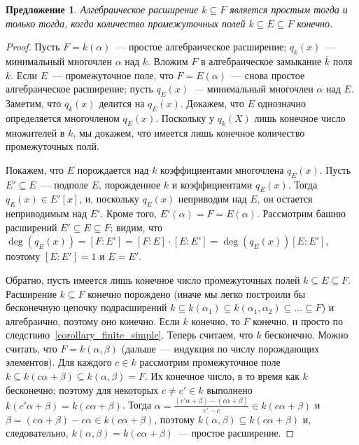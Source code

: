 \documentclass[a4paper,11pt]{scrartcl}
\theoremstyle{plain}
\newtheorem{proposition}[theorem]{Предложение}
\theoremstyle{definition}
\newcommand\sseq{\subseteq}
\begin{document}
\begin{proposition}
Алгебраическое расширение $k\sseq F$ является простым тогда и только
тогда, когда количество промежуточных полей $k\sseq E\sseq F$ конечно.
\end{proposition}
\begin{proof}
Пусть $F=k(\alpha)$~--- простое алгебраическое расширение;
$q_k(x)$~---
минимальный многочлен $\alpha$ над $k$. Вложим $F$ в алгебраическое
замыкание $\overline{k}$ поля $k$. Если $E$~--- промежуточное поле,
что $F=E(\alpha)$~--- снова простое алгебраическое расширение; пусть
$q_E(x)$~--- минимальный многочлен $\alpha$ над $E$.
Заметим, что $q_k(x)$
делится на $q_E(x)$. Докажем, что $E$ однозначно определяется
многочленом $q_E(x)$. Поскольку у $q_k(X)$ лишь конечное число
множителей в $\overline{k}$, мы докажем, что имеется лишь конечное
количество промежуточных полй.

Покажем, что $E$ порождается над $k$ коэффициентами многочлена
$q_E(x)$. Пусть $E'\sseq E$~--- подполе $E$, порожденное $k$ и
коэффициентами $q_E(x)$. Тогда $q_E(x)\in E'[x]$, и, поскольку
$q_E(x)$ неприводим над $E$, он остается неприводимым над $E'$. Кроме
того, $E'(\alpha)=F=E(\alpha)$.
Рассмотрим башню расширений $E'\sseq E\sseq F$;
видим, что $\deg(q_E(x))=[F:E']=[F:E]\cdot
[E:E']=\deg(q_E(x))[E:E']$, поэтому $[E:E']=1$ и $E=E'$.

Обратно, пусть имеется лишь конечное число промежуточных полей
$k\sseq E\sseq F$. Расширение $k\sseq F$ конечно порождено (иначе мы
легко
построили бы бесконечную цепочку подрасширений
$k\sseq k(\alpha_1)\sseq
k(\alpha_1,\alpha_2)\sseq\dots\sseq F$) и алгебраично, поэтому оно
конечно. Если $k$ конечно, то $F$ конечно, и просто по
следствию~\ref{corollary_finite_simple}.
Теперь считаем, что $k$ бесконечно. Можно считать, что
$F=k(\alpha,\beta)$
(дальше~--- индукция по числу порождающих элементов).
Для каждого $c\in k$ рассмотрим промежуточное поле $k\sseq
k(c\alpha+\beta)\sseq k(\alpha,\beta)=F$. Их конечное число, в то
время как $k$
бесконечно; поэтому для некоторых $c\neq c'\in k$ выполнено
$k(c'\alpha+\beta)=k(c\alpha+\beta)$. Тогда
$\alpha=\frac{(c'\alpha+\beta)-(c\alpha+\beta)}{c'-c}\in
k(c\alpha+\beta)$
и $\beta=(c\alpha+\beta)-c\alpha\in k(c\alpha+\beta)$, поэтому
$k (\alpha,\beta)\sseq k(c\alpha+\beta)$ и,
следовательно, $k(\alpha,\beta)=k(c\alpha+\beta)$~--- простое
расширение.
\end{proof}
\end{document}

